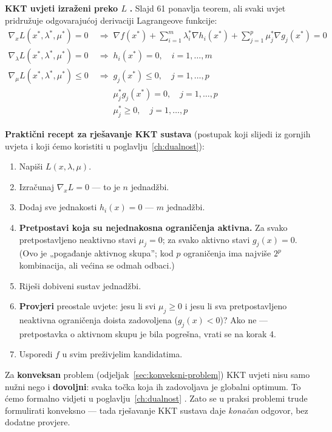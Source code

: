 \textbf{KKT uvjeti izraženi preko $L$} \textbf{.} Slajd 61 ponavlja
teorem, ali svaki uvjet pridružuje odgovarajućoj derivaciji Lagrangeove
funkcije:
\begin{align}
\nabla_x L(x^{*},\lambda^{*},\mu^{*}) = 0
  &\;\Longrightarrow\; \nabla f(x^{*})
    + \sum_{i=1}^{m}\lambda_i^{*}\nabla h_i(x^{*})
    + \sum_{j=1}^{p}\mu_j^{*}\nabla g_j(x^{*}) = 0 \\
\nabla_\lambda L(x^{*},\lambda^{*},\mu^{*}) = 0
  &\;\Longrightarrow\; h_i(x^{*}) = 0, \quad i = 1,\dots,m \\
\nabla_\mu L(x^{*},\lambda^{*},\mu^{*}) \le 0
  &\;\Longrightarrow\; g_j(x^{*}) \le 0, \quad j = 1,\dots,p \\
&\phantom{\;\Longrightarrow\;} \mu_j^{*}g_j(x^{*}) = 0, \quad j = 1,\dots,p \\
&\phantom{\;\Longrightarrow\;} \mu_j^{*} \ge 0, \quad j = 1,\dots,p
\end{align}

\textbf{Praktični recept za rješavanje KKT sustava} (postupak koji slijedi iz
gornjih uvjeta i koji ćemo koristiti u poglavlju~\ref{ch:dualnost}):

\begin{enumerate}
  \item Napiši $L(x,\lambda,\mu)$.
  \item Izračunaj $\nabla_x L = 0$ --- to je $n$ jednadžbi.
  \item Dodaj sve jednakosti $h_i(x) = 0$ --- $m$ jednadžbi.
  \item \textbf{Pretpostavi koja su nejednakosna ograničenja aktivna.} Za svako
        pretpostavljeno neaktivno stavi $\mu_j = 0$; za svako aktivno stavi
        $g_j(x) = 0$. (Ovo je „pogađanje aktivnog skupa”; kod $p$ ograničenja
        ima najviše $2^p$ kombinacija, ali većina se odmah odbaci.)
  \item Riješi dobiveni sustav jednadžbi.
  \item \textbf{Provjeri} preostale uvjete: jesu li svi $\mu_j \ge 0$ i jesu li
        sva pretpostavljeno neaktivna ograničenja doista zadovoljena
        ($g_j(x) < 0$)? Ako ne --- pretpostavka o aktivnom skupu je bila
        pogrešna, vrati se na korak 4.
  \item Usporedi $f$ u svim preživjelim kandidatima.
\end{enumerate}

\begin{napomena}
Za \textbf{konveksan} problem (odjeljak~\ref{sec:konveksni-problem}) KKT uvjeti
nisu samo nužni nego i \textbf{dovoljni}: svaka točka koja ih zadovoljava je
globalni optimum. To ćemo formalno vidjeti u poglavlju~\ref{ch:dualnost}
. Zato se u praksi problemi trude formulirati konveksno --- tada
rješavanje KKT sustava daje \emph{konačan} odgovor, bez dodatne provjere.
\end{napomena}

